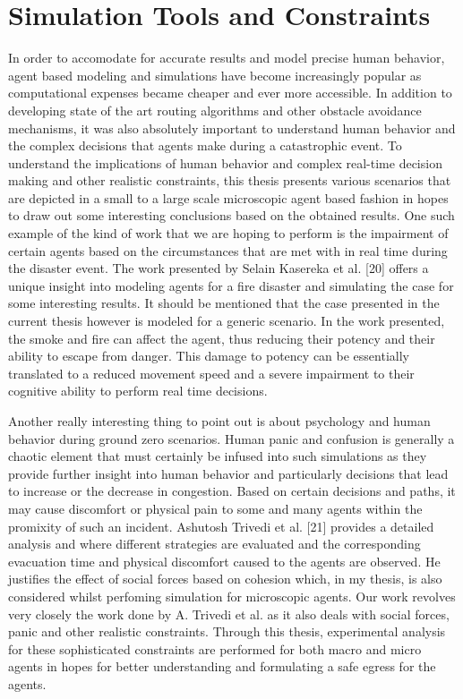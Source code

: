 \section{Simulation Tools and Constraints}
\label{sec:pastwork:Simulation Tool and Constraints}

In order to accomodate for accurate results and model precise human behavior, agent based modeling and simulations have become increasingly popular as computational expenses became cheaper and ever more accessible. In addition to developing state of the art routing algorithms and other obstacle avoidance mechanisms, it was also absolutely important to understand human behavior and the complex decisions that agents make during a catastrophic event. To understand the implications of human behavior and complex real-time decision making and other realistic constraints, this thesis presents various scenarios that are depicted in a small to a large scale microscopic agent based fashion in hopes to draw out some interesting conclusions based on the obtained results. One such example of the kind of work that we are hoping to perform is the impairment of certain agents based on the circumstances that are met with in real time during the disaster event. The work presented by Selain Kasereka et al. [20] offers a unique insight into modeling agents for a fire disaster and simulating the case for some interesting results. It should be mentioned that the case presented in the current thesis however is modeled for a generic scenario. In the work presented, the smoke and fire can affect the agent, thus reducing their potency and their ability to escape from danger. This damage to potency can be essentially translated to a reduced movement speed and a severe impairment to their cognitive ability to perform real time decisions. 

Another really interesting thing to point out is about psychology and human behavior during ground zero scenarios. Human panic and confusion is generally a chaotic element that must certainly be infused into such simulations as they provide further insight into human behavior and particularly decisions that lead to increase or the decrease in congestion. Based on certain decisions and paths, it may cause discomfort or physical pain to some and many agents within the promixity of such an incident. Ashutosh Trivedi et al. [21] provides a detailed analysis and where different strategies are evaluated and the corresponding evacuation time and physical discomfort caused to the agents are observed. He justifies the effect of social forces based on cohesion which, in my thesis, is also considered whilst perfoming simulation for microscopic agents. Our work revolves very closely the work done by A. Trivedi et al. as it also deals with social forces, panic and other realistic constraints. Through this thesis, experimental analysis for these sophisticated constraints are performed for both macro and micro agents in hopes for better understanding and formulating a safe egress for the agents.

